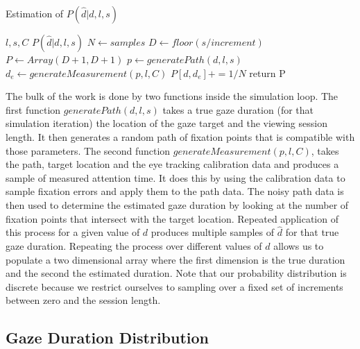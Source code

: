 \documentclass[12pt,a4paper]{article}
\numberwithin{equation}{section}
\begin{document}
\begin{algorithm}
\caption{Estimation of $P(\hat{d}|d,l,s)$}\label{alg:p_of_dhat}
\begin{algorithmic}
  \Require $l,s,C$
  \Ensure $P(\hat{d}|d,l,s)$
  \State $N \gets samples$              
  \State $D \gets floor(s / increment)$ 
  \State $P \gets Array(D+1,D+1)$       
                    
                    
      \State $p \gets generatePath(d,l,s)$
      \State $d_e \gets generateMeasurement(p,l,C)$  
      \State $P[d,d_e] += 1/N$          
    \EndFor
  \EndFor
  \State return P
\end{algorithmic}
\end{algorithm}


The bulk of the work is done by two functions inside the simulation loop. The first function
$generatePath(d,l,s)$ takes a true gaze duration (for that simulation iteration) the location
of the gaze target and the viewing session length. It then
generates a random path of fixation points that is compatible with those parameters.
The second function 
$generateMeasurement(p,l,C)$, takes the path, target location and the eye tracking calibration 
data and produces a sample of measured attention time. It does this by using the calibration data to sample
fixation errors and apply them to the path data. The noisy path data is then used to determine
the estimated gaze duration by looking at the number of fixation points that intersect with the target
location.
Repeated application of this process for a given value of $d$ produces multiple samples of $\hat{d}$
for that true gaze duration. Repeating the process over different 
values of $d$ allows us to populate a two dimensional array where the first dimension is the
true duration and the second the estimated duration. Note that our probability distribution is discrete
because we restrict ourselves to sampling over a fixed set of increments 
between zero and the session length.

\subsection{Gaze Duration Distribution}
\end{document}
